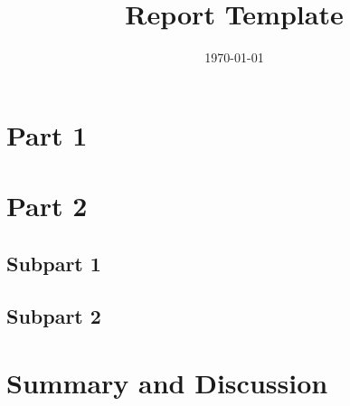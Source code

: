 \documentclass{article}
\title{Report Template
}
\date{\today}
\begin{document}
\maketitle


\section*{Part 1}



\section*{Part 2}
\subsection*{Subpart 1}

\subsection*{Subpart 2}

\section*{Summary and Discussion}

\end{document}
